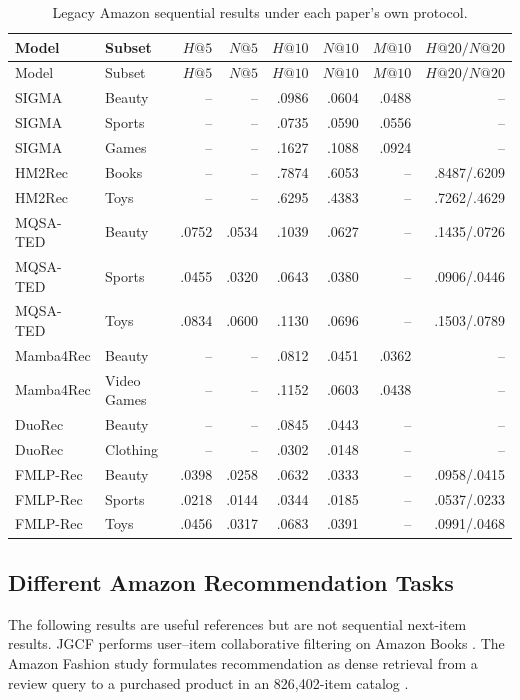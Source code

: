 \begin{longtable}{@{}p{}p{}rrrrrr@{}}
\caption{Legacy Amazon sequential results under each paper's own protocol.}
\label{tab:legacy-amazon}\\
\toprule
Model & Subset & $H@5$ & $N@5$ & $H@10$ & $N@10$ & $M@10$ & $H@20/N@20$ \\
\midrule
\endfirsthead
\toprule
Model & Subset & $H@5$ & $N@5$ & $H@10$ & $N@10$ & $M@10$ & $H@20/N@20$ \\
\midrule
\endhead
SIGMA & Beauty & -- & -- & .0986 & .0604 & .0488 & -- \\
SIGMA & Sports & -- & -- & .0735 & .0590 & .0556 & -- \\
SIGMA & Games & -- & -- & .1627 & .1088 & .0924 & -- \\
HM2Rec & Books & -- & -- & .7874 & .6053 & -- & .8487/.6209 \\
HM2Rec & Toys & -- & -- & .6295 & .4383 & -- & .7262/.4629 \\
MQSA-TED & Beauty & .0752 & .0534 & .1039 & .0627 & -- & .1435/.0726 \\
MQSA-TED & Sports & .0455 & .0320 & .0643 & .0380 & -- & .0906/.0446 \\
MQSA-TED & Toys & .0834 & .0600 & .1130 & .0696 & -- & .1503/.0789 \\
Mamba4Rec & Beauty & -- & -- & .0812 & .0451 & .0362 & -- \\
Mamba4Rec & Video Games & -- & -- & .1152 & .0603 & .0438 & -- \\
DuoRec & Beauty & -- & -- & .0845 & .0443 & -- & -- \\
DuoRec & Clothing & -- & -- & .0302 & .0148 & -- & -- \\
FMLP-Rec & Beauty & .0398 & .0258 & .0632 & .0333 & -- & .0958/.0415 \\
FMLP-Rec & Sports & .0218 & .0144 & .0344 & .0185 & -- & .0537/.0233 \\
FMLP-Rec & Toys & .0456 & .0317 & .0683 & .0391 & -- & .0991/.0468 \\
\bottomrule
\end{longtable}

\subsection{Different Amazon Recommendation Tasks}

The following results are useful references but are not sequential next-item
results. JGCF performs user--item collaborative filtering on Amazon Books
\cite{JGCF}. The Amazon Fashion study formulates recommendation as dense
retrieval from a review query to a purchased product in an 826,402-item
catalog \cite{FASHIONRETRIEVAL}.

